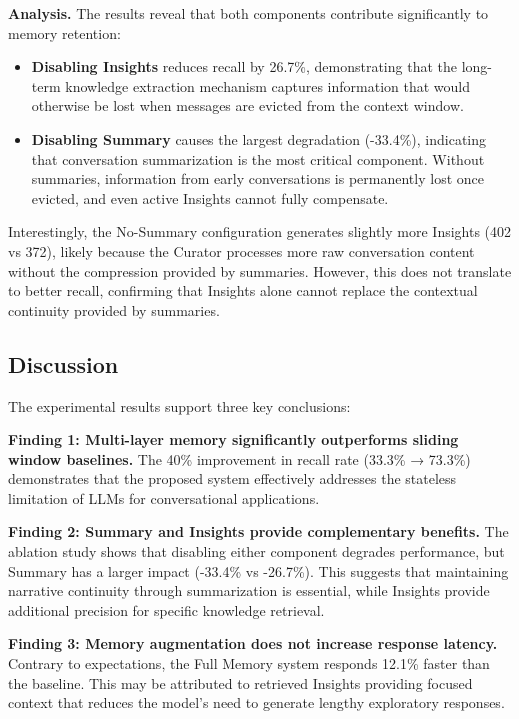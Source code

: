 \documentclass{article} %
\begin{document}
\textbf{Analysis.} The results reveal that both components contribute significantly to memory retention:

\begin{itemize}
    \item \textbf{Disabling Insights} reduces recall by 26.7\%, demonstrating that the long-term knowledge extraction mechanism captures information that would otherwise be lost when messages are evicted from the context window.
    \item \textbf{Disabling Summary} causes the largest degradation (-33.4\%), indicating that conversation summarization is the most critical component. Without summaries, information from early conversations is permanently lost once evicted, and even active Insights cannot fully compensate.
\end{itemize}

Interestingly, the No-Summary configuration generates slightly more Insights (402 vs 372), likely because the Curator processes more raw conversation content without the compression provided by summaries. However, this does not translate to better recall, confirming that Insights alone cannot replace the contextual continuity provided by summaries.

\subsection{Discussion}
\label{sec:discussion}

The experimental results support three key conclusions:

\textbf{Finding 1: Multi-layer memory significantly outperforms sliding window baselines.} The 40\% improvement in recall rate (33.3\% → 73.3\%) demonstrates that the proposed system effectively addresses the stateless limitation of LLMs for conversational applications.

\textbf{Finding 2: Summary and Insights provide complementary benefits.} The ablation study shows that disabling either component degrades performance, but Summary has a larger impact (-33.4\% vs -26.7\%). This suggests that maintaining narrative continuity through summarization is essential, while Insights provide additional precision for specific knowledge retrieval.

\textbf{Finding 3: Memory augmentation does not increase response latency.} Contrary to expectations, the Full Memory system responds 12.1\% faster than the baseline. This may be attributed to retrieved Insights providing focused context that reduces the model's need to generate lengthy exploratory responses.
\end{document}
